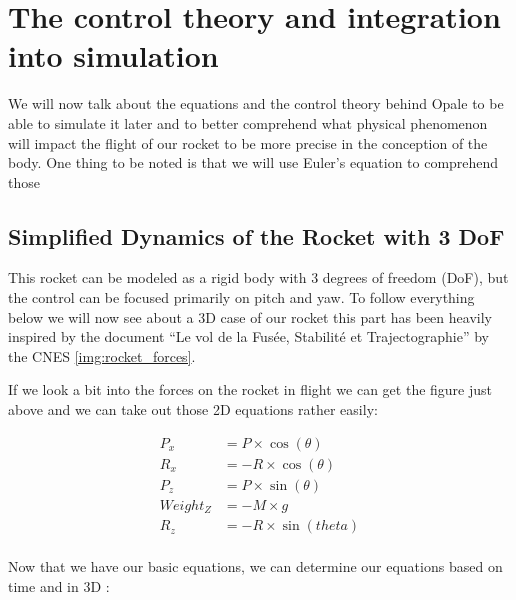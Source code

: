\section{The control theory and integration into simulation}
We will now talk about the equations and the control theory behind Opale to be
able to simulate it later and to better comprehend what physical phenomenon
will impact the flight of our rocket to be more precise in the conception of
the body. One thing to be noted is that we will use Euler's equation to
comprehend those

\subsection{Simplified Dynamics of the Rocket with 3 DoF}


\FloatBarrier

This rocket can be modeled as a rigid body with 3 degrees of freedom (DoF), but
the control can be focused primarily on pitch and yaw. To follow everything
below we will now see about a 3D case of our rocket this part has been heavily
inspired by the document “Le vol de la Fusée, Stabilité et Trajectographie” by
the CNES \ref{img:rocket_forces}.

If we look a bit into the forces on the rocket in flight we can get the figure
just above and we can take out those 2D equations rather easily:

\begin{minipage}[c]{1\textwidth}
    \centering
    \begin{align*}
        P_x      & = P \times \cos({\theta})   \\
        R_x      & = - R \times \cos({\theta}) \\
        P_z      & = P \times \sin({\theta})   \\
        Weight_Z & = -M \times g               \\
        R_z      & = -R \times \sin ({theta})  \\
    \end{align*}
\end{minipage}
\FloatBarrier

Now that we have our basic equations, we can determine our equations based on
time and in 3D :

